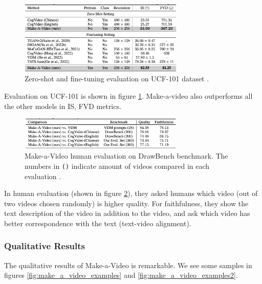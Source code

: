 \begin{figure}[h]
    \centering
    \includegraphics[width=0.7\textwidth]{images/make_a_video/ucf_101.png}
    \caption{Zero-shot and fine-tuning evaluation on UCF-101 dataset \cite{make_a_video}.}
    \label{fig:make_a_video_ucf_101}
\end{figure}

Evaluation on UCF-101 is shown in figure \ref{fig:make_a_video_ucf_101}. Make-a-video also outperforms all the other models in IS, FVD metrics.

\begin{figure}[h]
    \centering
    \includegraphics[width=0.7\textwidth]{images/make_a_video/eval.png}
    \caption{Make-a-Video human evaluation on DrawBench benchmark. The numbers in \texttt{()} indicate amount of videos compared in each evaluation \cite{make_a_video}.}
    \label{fig:make_a_video_human_eval}
\end{figure}

In human evaluation (shown in figure \ref{fig:make_a_video_human_eval}), they asked humans which video (out of two videos chosen randomly) is higher quality. For faithfulness, they show the text description of the video in addition to the video, and ask which video has better correspondence with the text (text-video alignment).




\subsubsection{Qualitative Results}

The qualitative results of Make-a-Video is remarkable. We see some samples in figures \ref{fig:make_a_video_examples} and \ref{fig:make_a_video_examples2}.

